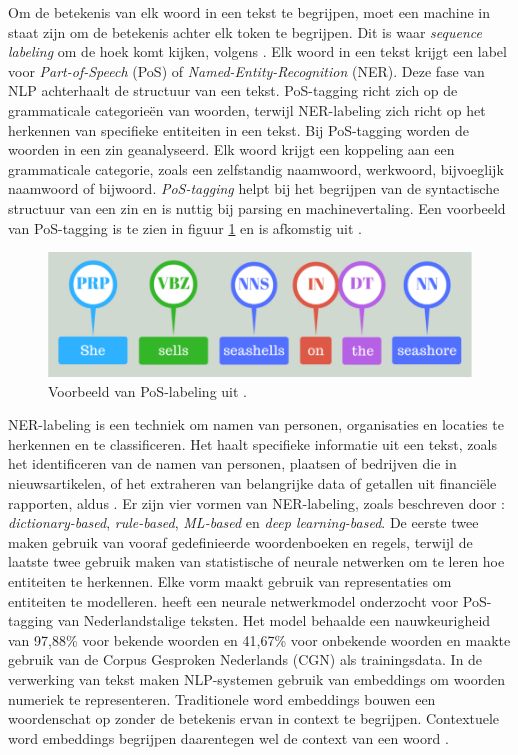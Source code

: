 Om de betekenis van elk woord in een tekst te begrijpen, moet een machine in staat zijn om de betekenis achter elk token te begrijpen. Dit is waar \textit{sequence labeling} om de hoek komt kijken, volgens \textcite{Eisenstein2019}. Elk woord in een tekst krijgt een label voor \textit{Part-of-Speech} (PoS) of \textit{Named-Entity-Recognition} (NER). Deze fase van NLP achterhaalt de structuur van een tekst. PoS-tagging richt zich op de grammaticale categorieën van woorden, terwijl NER-labeling zich richt op het herkennen van specifieke entiteiten in een tekst. Bij PoS-tagging worden de woorden in een zin geanalyseerd. Elk woord krijgt een koppeling aan een grammaticale categorie, zoals een zelfstandig naamwoord, werkwoord, bijvoeglijk naamwoord of bijwoord. \textit{PoS-tagging} helpt bij het begrijpen van de syntactische structuur van een zin en is nuttig bij parsing en machinevertaling. Een voorbeeld van PoS-tagging is te zien in figuur \ref{fig:pos-labeling} en is afkomstig uit \textcite{Bilisci2021}.

\begin{center}
	\begin{figure}[H]
		\includegraphics[width=15cm]{img/poslabeling.png}
		\caption{Voorbeeld van PoS-labeling uit \autocite{Bilisci2021}.}
		\label{fig:pos-labeling}
	\end{figure}
\end{center}

\medspace

NER-labeling is een techniek om namen van personen, organisaties en locaties te herkennen en te classificeren. Het haalt specifieke informatie uit een tekst, zoals het identificeren van de namen van personen, plaatsen of bedrijven die in nieuwsartikelen, of het extraheren van belangrijke data of getallen uit financiële rapporten, aldus \textcite{Jurafsky2014}. Er zijn vier vormen van NER-labeling, zoals beschreven door \textcite{Li2018}: \textit{dictionary-based}, \textit{rule-based}, \textit{ML-based} en \textit{deep learning-based}. De eerste twee maken gebruik van vooraf gedefinieerde woordenboeken en regels, terwijl de laatste twee gebruik maken van statistische of neurale netwerken om te leren hoe entiteiten te herkennen. Elke vorm maakt gebruik van representaties om entiteiten te modelleren. \textcite{Poel2008} heeft een neurale netwerkmodel onderzocht voor PoS-tagging van Nederlandstalige teksten. Het model behaalde een nauwkeurigheid van 97,88\% voor bekende woorden en 41,67\% voor onbekende woorden en maakte gebruik van de Corpus Gesproken Nederlands (CGN) als trainingsdata. In de verwerking van tekst maken NLP-systemen gebruik van embeddings om woorden numeriek te representeren. Traditionele word embeddings bouwen een woordenschat op zonder de betekenis ervan in context te begrijpen. Contextuele word embeddings begrijpen daarentegen wel de context van een woord \autocite{Eisenstein2019}. 

